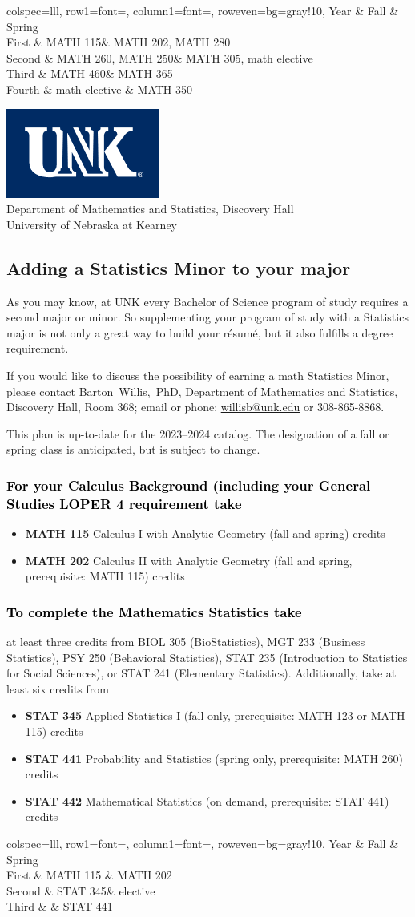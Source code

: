 \documentclass[10pt]{article}
\makeatletter
\newcommand{\calcone}{\textbf{MATH 115} Calculus I with Analytic Geometry (fall and spring) \dotfill 5 credits}
\newcommand{\calconeshort}{MATH 115}
\newcommand{\calctwo}{\textbf{MATH 202} Calculus II with Analytic Geometry (fall and spring, prerequisite: MATH 115) \dotfill 5 credits }
\newcommand{\calctwoshort}{MATH 202}
\newcommand{\foundationsshort}{MATH 250}
\newcommand{\calcthreeshort}{MATH 260}
\newcommand{\linearshort}{MATH 280}
\newcommand{\statistics}{\textbf{STAT 441} Probability and Statistics (spring only, prerequisite: MATH 260)  \dotfill  3 credits}
\newcommand{\statisticsshort}{STAT 441}
\newcommand{\statisticsII}{\textbf{STAT 442} Mathematical Statistics   (on demand, prerequisite: STAT 441)  \dotfill  3 credits}
\newcommand{\diffeqshort}{MATH 305}
\newcommand{\abstractalgebrashort}{MATH 350}
\newcommand{\complexshort}{MATH 365}
\newcommand{\advancedcalcshort}{MATH 460}
\newcommand{\appliedstat}{\textbf{STAT 345} Applied Statistics I (fall only, prerequisite: MATH 123 or MATH 115) \dotfill 3 credits}
\newcommand{\appliedstatshort}{STAT 345}
\newcommand{\contactbw}{\mbox{Barton Willis, PhD}, Department of Mathematics and Statistics,  Discovery Hall, Room 368;
email or phone: \href{mailto:willisb@unk.edu}{willisb@unk.edu} or 308-865-8868.}
\newcommand{\forinfo}[2]{If you would like to discuss the possibility of earning a math {#1}, please contact \contactbw}
\newcommand{\catalog}{2023--2024 }
\newcommand{\LOPER}{LOPER\xspace}
\newcommand{\uptodate}{This plan is up-to-date for  the \catalog catalog. The designation of a fall or spring class is 
anticipated, but  is subject to change.}
\newcommand{\myheading}{
\begin{flushleft}
\includegraphics[scale=0.3]{unk-logo}\\
\setcounter{footnote}{0}
\vspace{0.25in}
 \textcolor{unkblue}{Department of Mathematics and Statistics, Discovery Hall} \\
  \textcolor{unkblue}{University of Nebraska at Kearney}
\end{flushleft}}
\newcommand{\mathBS}{      
\begin{table}[ht]
 \caption*{Suggested Math B.S. program of study}
\center
  \begin{tblr}{
      colspec={lll},
      row{1}={font=\bfseries},
      column{1}={font=\itshape},
      row{even}={bg=gray!10},
    }
     Year        & Fall  & Spring   \\
    \toprule
    First & \calconeshort  & \calctwoshort, \linearshort  \\
    Second & \calcthreeshort{}, \foundationsshort & \diffeqshort, math elective \\
     Third & \advancedcalcshort              &  \complexshort{}\\ \hline
      Fourth & math elective &  \abstractalgebrashort  \\ 
    \bottomrule
  \end{tblr}
\end{table}}
\newcommand{\statMinor}{
 \begin{table}[ht]
  \caption*{Suggested Statistics Minor program of study}
\center
  \begin{tblr}{
      colspec={lll},
      row{1}={font=\bfseries},
      column{1}={font=\itshape},
      row{even}={bg=gray!10},
    }
      Year        & Fall  & Spring   \\
    \toprule    
            First & \calconeshort{}  & \calctwoshort \\ 
            Second &  \appliedstatshort &  elective \\ 
            Third &           &  \statisticsshort \\
       \bottomrule
  \end{tblr}
\end{table}}
\makeatother
\begin{document}
\mathBS

\newpage 
\myheading
\subsection*{\textbf{\textcolor{unkblue}{Adding a Statistics Minor to your major}}}



As you may know, at UNK every Bachelor of Science program of study requires a second
major or minor. So supplementing your  program of study with a Statistics major is not only a great
way to build your r\'esum\'e, but it also fulfills a degree requirement.

\forinfo{Statistics Minor}{}

\uptodate

\vspace{-0.1in}

\subsubsection*{\textcolor{black}{For your Calculus Background (including your General Studies \LOPER 4 requirement take}}
\begin{itemize}
\item  \calcone
\item \calctwo
\end{itemize}

\subsubsection*{\textcolor{black}{To complete the Mathematics Statistics take}}

at least three credits from BIOL 305 (BioStatistics), MGT 233 (Business Statistics), PSY 250 (Behavioral Statistics),
STAT 235 (Introduction to Statistics for Social Sciences), or STAT 241 (Elementary Statistics).   Additionally, take 
at least six credits from  
\begin{itemize}
\item \appliedstat
\item \statistics
\item \statisticsII
\end{itemize}
\statMinor
\end{document}
